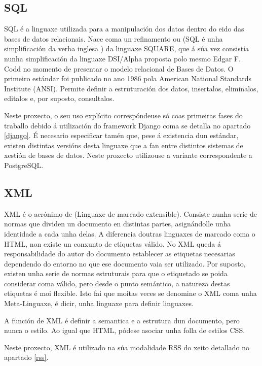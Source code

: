 \subsection{SQL}

SQL é a linguaxe utilizada para a manipulación dos datos dentro do eido das bases de datos relacionais. Nace coma un refinamento ou  (SQL é unha simplificación da verba inglesa ) da linguaxe SQUARE, que á súa vez consistía nunha simplificación da linguaxe DSI/Alpha proposta polo mesmo Edgar F. Codd no momento de presentar o modelo relacional de Bases de Datos. O primeiro estándar foi publicado no ano 1986 pola American National Standards Institute (ANSI)\cite{sql1}. Permite definir a estruturación dos datos, insertalos, eliminalos, editalos e, por suposto, consultalos.

Neste proxecto, o seu uso explícito correspóndeuse só coas primeiras fases do traballo debido á utilización do framework Django coma se detalla no apartado \ref{django}. É necesario especificar tamén que, pese á existencia dun estándar, existen distintas versións desta linguaxe que a fan  entre distintos sistemas de xestión de bases de datos\cite{sql2}. Neste proxecto utilizouse a variante correspondente a PostgreSQL.


\subsection{XML}

XML é o acrónimo de  (Linguaxe de marcado extensible). Consiste nunha serie de normas que dividen un documento en distintas partes, asignándolle unha identidade a cada unha delas. A diferencia doutras linguaxes de marcado coma o HTML, non existe un conxunto de etiquetas válido. No XML queda á responsabilidade do autor do documento establecer as etiquetas necesarias dependendo do entorno no que ese documento vaia ser utilizado. Por suposto, existen unha serie de normas estruturais para que o etiquetado se poida considerar coma válido, pero desde o punto semántico, a natureza destas etiquetas é moi flexible. Isto fai que moitas veces se denomine o XML coma unha Meta-Linguaxe, é dicir, unha linguaxe para definir linguaxes\cite{xml1}.

A función de XML é definir a semantica e a estrutura dun documento, pero nunca o estilo. Ao igual que HTML, pódese asociar unha folla de estilos CSS.

Neste proxecto, XML é utilizado na súa modalidade RSS do xeito detallado no apartado \ref{rss}.

